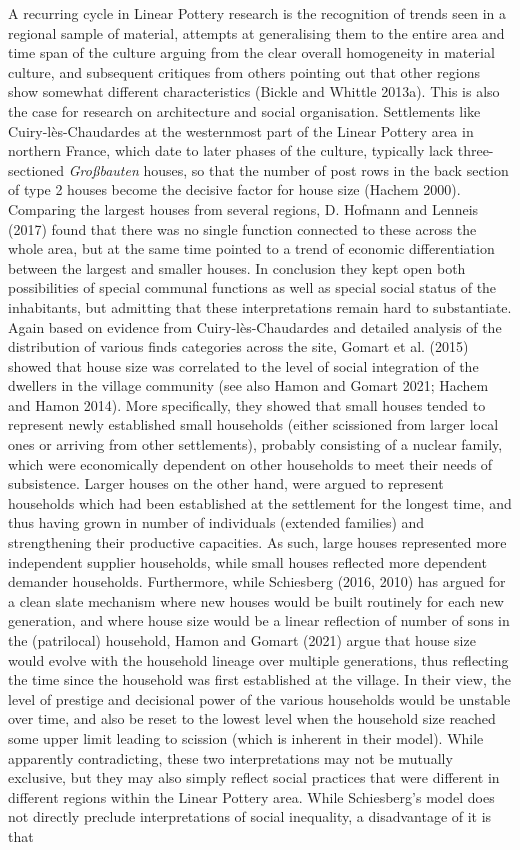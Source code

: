 \documentclass[
  12pt,
  a4paper, twoside]{book}
\begin{document}
A recurring cycle in Linear Pottery research is the recognition of trends seen in a regional sample of material, attempts at generalising them to the entire area and time span of the culture arguing from the clear overall homogeneity in material culture, and subsequent critiques from others pointing out that other regions show somewhat different characteristics (Bickle and Whittle 2013a). This is also the case for research on architecture and social organisation. Settlements like Cuiry-lès-Chaudardes at the westernmost part of the Linear Pottery area in northern France, which date to later phases of the culture, typically lack three-sectioned \emph{Großbauten} houses, so that the number of post rows in the back section of type 2 houses become the decisive factor for house size (Hachem 2000). Comparing the largest houses from several regions, D. Hofmann and Lenneis (2017) found that there was no single function connected to these across the whole area, but at the same time pointed to a trend of economic differentiation between the largest and smaller houses. In conclusion they kept open both possibilities of special communal functions as well as special social status of the inhabitants, but admitting that these interpretations remain hard to substantiate. Again based on evidence from Cuiry-lès-Chaudardes and detailed analysis of the distribution of various finds categories across the site, Gomart et al. (2015) showed that house size was correlated to the level of social integration of the dwellers in the village community (see also Hamon and Gomart 2021; Hachem and Hamon 2014). More specifically, they showed that small houses tended to represent newly established small households (either scissioned from larger local ones or arriving from other settlements), probably consisting of a nuclear family, which were economically dependent on other households to meet their needs of subsistence. Larger houses on the other hand, were argued to represent households which had been established at the settlement for the longest time, and thus having grown in number of individuals (extended families) and strengthening their productive capacities. As such, large houses represented more independent supplier households, while small houses reflected more dependent demander households. Furthermore, while Schiesberg (2016, 2010) has argued for a clean slate mechanism where new houses would be built routinely for each new generation, and where house size would be a linear reflection of number of sons in the (patrilocal) household, Hamon and Gomart (2021) argue that house size would evolve with the household lineage over multiple generations, thus reflecting the time since the household was first established at the village. In their view, the level of prestige and decisional power of the various households would be unstable over time, and also be reset to the lowest level when the household size reached some upper limit leading to scission (which is inherent in their model). While apparently contradicting, these two interpretations may not be mutually exclusive, but they may also simply reflect social practices that were different in different regions within the Linear Pottery area. While Schiesberg's model does not directly preclude interpretations of social inequality, a disadvantage of it is that 
\end{document}
